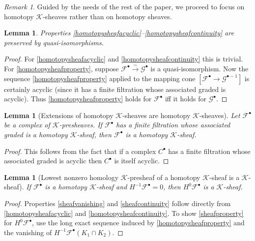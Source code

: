 \documentclass[12pt]{article}
\newtheorem{lemma}[theorem]{Lemma}
\theoremstyle{definition}
\theoremstyle{remark}
\newtheorem{remark}[theorem]{Remark}
\numberwithin{equation}{subsection}
\newcommand{\F}{\mathcal F}
\newcommand{\G}{\mathcal G}
\newcommand{\K}{\mathcal K}
\begin{document}
\begin{remark}
Guided by the needs of the rest of the paper, we proceed to focus on homotopy $\K$-sheaves rather than on homotopy sheaves.
\end{remark}

\begin{lemma}\label{qihomotopysheaf}
Properties \eqref{homotopysheafacyclic}--\eqref{homotopysheafcontinuity} are preserved by quasi-isomorphisms.
\end{lemma}

\begin{proof}
For \eqref{homotopysheafacyclic} and \eqref{homotopysheafcontinuity} this is trivial.  For \eqref{homotopysheafproperty}, suppose $\F^\bullet\xrightarrow\sim\G^\bullet$ is a quasi-isomorphism.  Now the sequence \eqref{homotopysheafproperty} applied to the mapping cone $[\F^\bullet\to\G^{\bullet-1}]$ is certainly acyclic (since it has a finite filtration whose associated graded is acyclic).  Thus \eqref{homotopysheafproperty} holds for $\F^\bullet$ iff it holds for $\G^\bullet$.
\end{proof}

\begin{lemma}[Extensions of homotopy $\K$-sheaves are homotopy $\K$-sheaves]\label{associatedgradedhomotopysheaf}
Let $\F^\bullet$ be a complex of $\K$-presheaves.  If $\F^\bullet$ has a finite filtration whose associated graded is a homotopy $\K$-sheaf, then $\F^\bullet$ is a homotopy $\K$-sheaf.
\end{lemma}

\begin{proof}
This follows from the fact that if a complex $C^\bullet$ has a finite filtration whose associated graded is acyclic then $C^\bullet$ is itself acyclic.
\end{proof}

\begin{lemma}[Lowest nonzero homology $\K$-presheaf of a homotopy $\K$-sheaf is a $\K$-sheaf]\label{lowervanishingimpliessheaf}
If $\F^\bullet$ is a homotopy $\K$-sheaf and $H^{-1}\F^\bullet=0$, then $H^0\F^\bullet$ is a $\K$-sheaf.
\end{lemma}

\begin{proof}
Properties \eqref{sheafvanishing} and \eqref{sheafcontinuity} follow directly from \eqref{homotopysheafacyclic} and \eqref{homotopysheafcontinuity}.  To show \eqref{sheafproperty} for $H^0\F^\bullet$, use the long exact sequence induced by \eqref{homotopysheafproperty} and the vanishing of $H^{-1}\F^\bullet(K_1\cap K_2)$.
\end{proof}
\end{document}
